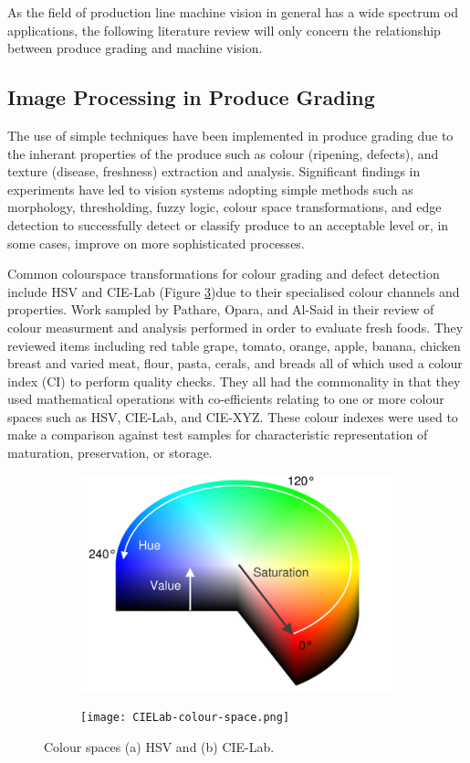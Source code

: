 \documentclass[fleqn,twoside]{article}
\begin{document}
As the field of production line machine vision in general has a wide spectrum od applications, the following literature review will only concern the relationship between produce grading and machine vision. 


\subsection{Image Processing in Produce Grading}

 
The use of simple techniques have been implemented in produce grading due to the inherant properties of the produce such as colour (ripening, defects), and texture (disease, freshness) extraction and analysis. Significant findings in experiments have led to vision systems adopting simple methods such as morphology, thresholding, fuzzy logic, colour space transformations, and edge detection to successfully detect or classify produce to an acceptable level or, in some cases, improve on more sophisticated processes.

Common colourspace transformations for colour grading and defect detection include HSV and CIE-Lab (Figure \ref{fig:colour-space})due to their specialised colour channels and properties. Work sampled by Pathare, Opara, and Al-Said \cite{pathare} in their review of colour measurment and analysis performed in order to evaluate fresh foods. They reviewed items including red table grape, tomato, orange, apple, banana, chicken breast and varied meat, flour, pasta, cerals, and breads all of which used a colour index (CI) to perform quality checks. They all had the commonality in that they used mathematical operations with co-efficients relating to one or more colour spaces such as HSV, CIE-Lab, and CIE-XYZ. These colour indexes were used to make a comparison against test samples for characteristic representation of maturation, preservation, or storage. 

\begin{figure}[h]
	\centering
	\begin{subfigure}{.5\textwidth}
		\centering
		\includegraphics[width=.7\linewidth]{hue_sat.png}
		\caption{}
		\label{fig:HSV}
	\end{subfigure}%
	\begin{subfigure}{.5\textwidth}
		\centering
		\texttt{[image: CIELab-colour-space.png]}
		\caption{}
		\label{fig:Lab}
	\end{subfigure}%
	\caption{Colour spaces (a) HSV and (b) CIE-Lab.}
	\label{fig:colour-space}
\end{figure}
\end{document}
